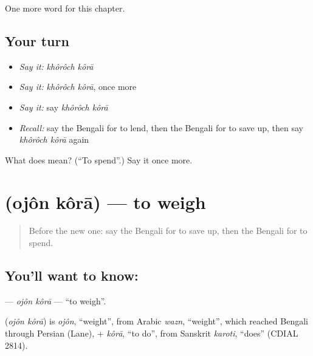 \begin{grammarlens}[title={What you've built}]
One more word for this chapter.
\end{grammarlens}

\subsection*{Your turn}
\begin{itemize}
\raggedright
  \item \emph{Say it:} \emph{khôrôch kôrā}
  \item \emph{Say it:} \emph{khôrôch kôrā}, once more
  \item \emph{Say it:} say \emph{khôrôch kôrā}
  \item \emph{Recall:} say the Bengali for to lend, then the Bengali for to save up, then say \emph{khôrôch kôrā} again
\end{itemize}

\begin{tcolorbox}[breakable,colback=teal!4,colframe=teal!35!black,title={Before you move on}]
What does   mean? (\textquotedblleft{}To spend\textquotedblright{}.) Say it once more.
\end{tcolorbox}
\section[\texorpdfstring{\bn{ওজন} \bn{করা} (ojôn kôrā)}{ওজন করা (ojôn kôrā)}]{  (ojôn kôrā) — to weigh}

\label{lesson:BN-C209-ojon-kora}



\begin{quote}
Before the new one: say the Bengali for to save up, then the Bengali for to spend.
\end{quote}

\subsection*{You'll want to know:  }
\textbf{ } — \emph{ojôn kôrā} — \textquotedblleft{}to weigh\textquotedblright{}.

\begin{cousinweb}
\textbf{ } (\emph{ojôn kôrā}) is \emph{ojôn}, \textquotedblleft{}weight\textquotedblright{}, from Arabic \emph{wazn}, \textquotedblleft{}weight\textquotedblright{}, which reached Bengali through Persian (Lane), + \emph{kôrā}, \textquotedblleft{}to do\textquotedblright{}, from Sanskrit \emph{karoti}, \textquotedblleft{}does\textquotedblright{} (CDIAL 2814).
\end{cousinweb}

